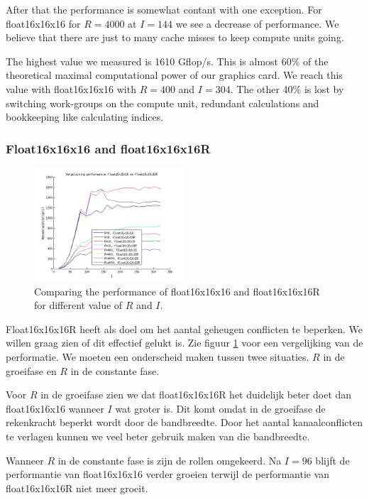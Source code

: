\documentclass[11pt]{IEEEtran}
\begin{document}
After that the performance is somewhat contant with one exception. For float16x16x16 for $R=4000$ at $I=144$ we see a decrease of performance. We believe that there are just to many cache misses to keep compute units going.

The highest value we measured is 1610 Gflop/s. This is almost 60\% of the theoretical maximal computational power of our graphics card. We reach this value with float16x16x16 with $R=400$ and $I=304$. The other 40\% is lost by switching work-groups on the compute unit, redundant calculations and bookkeeping like calculating indices.


\subsubsection{Float16x16x16 and float16x16x16R}
\begin{figure}[h!]
\centering
\includegraphics[width=0.5\textwidth]{fl16_vs_fl16R}
\caption{\label{fl16_vs_fl16R} Comparing the performance of float16x16x16 and float16x16x16R for different value of $R$ and $I$.}
\end{figure}

Float16x16x16R heeft als doel om het aantal geheugen conflicten te beperken. We willen graag zien of dit effectief gelukt is. Zie figuur \ref{fl16_vs_fl16R} voor een vergelijking van de performatie. We moeten een onderscheid maken tussen twee situaties. $R$ in de groeifase en $R$ in de constante fase.

Voor $R$ in de groeifase zien we dat float16x16x16R het duidelijk beter doet dan float16x16x16 wanneer $I$ wat groter is. Dit komt omdat in de groeifase de rekenkracht beperkt wordt door de bandbreedte. Door het aantal kanaalconflicten te verlagen kunnen we veel beter gebruik maken van die bandbreedte.

Wanneer $R$ in de constante fase is zijn de rollen omgekeerd. Na $I=96$ blijft de performantie van float16x16x16 verder groeien terwijl de performantie van float16x16x16R niet meer groeit.
\end{document}
